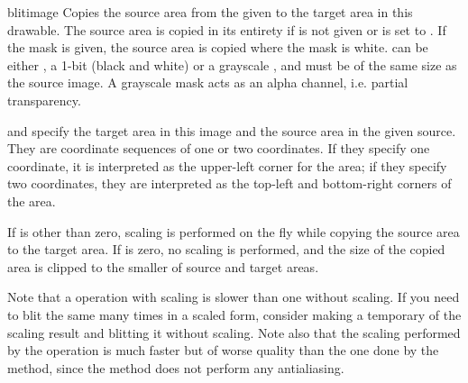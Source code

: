 \begin{methoddesc}{blit}{image}
Copies the source area from the given  to the target area
in this drawable. The source area is copied in its entirety if
 is not given or is set to . If the mask is
given, the source area is copied where the mask is white. 
can be either , a 1-bit (black and white)  or
a grayscale , and must be of the same size as the source image. A grayscale mask acts
as an alpha channel, i.e. partial transparency.

 and  specify the target area in this image 
and the source area in the given source. They are coordinate sequences of 
one or two coordinates. If they specify one coordinate, it is interpreted as 
the upper-left corner for the area; if they specify two coordinates, they 
are interpreted as the top-left and bottom-right corners of the area.

If  is other than zero, scaling is performed on the fly while 
copying the source area to the target area. If  is zero, no 
scaling is performed, and the size of the copied area is clipped to the 
smaller of source and target areas.

Note that a  operation with scaling is slower than one without 
scaling. If you need to blit the same  many times in a scaled 
form, consider making a temporary  of the scaling result and 
blitting it without scaling. Note also that the scaling performed by the 
 operation is much faster but of worse quality than the one 
done by the  method, since the  method does not 
perform any antialiasing.
\end{methoddesc}

